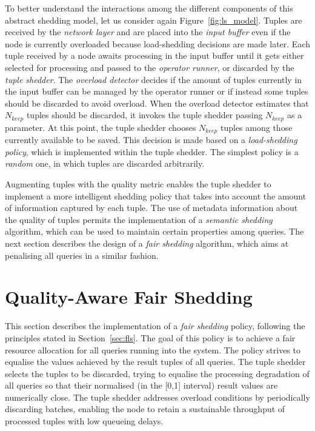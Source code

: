 To better understand the interactions among the different components of this abstract shedding model, let
us consider again Figure~\ref{fig:ls_model}. Tuples are received by the \emph{network layer} and are
placed into the \emph{input buffer} even if the node is currently overloaded because \mbox{load-shedding}
decisions are made later. Each tuple received by a node awaits processing in the input buffer until it
gets either selected for processing and passed to the \emph{operator runner}, or discarded by the
\emph{tuple shedder}. The \emph{overload detector} decides if the amount of tuples
currently in the input buffer can be managed by the operator runner or if instead some tuples should
be discarded to avoid overload. When the overload detector estimates that $N_{keep}$ tuples should be
discarded, it invokes the tuple shedder passing $N_{keep}$ as a parameter. At this point, the tuple
shedder chooses $N_{keep}$ tuples among those currently available to be saved.
This decision is made based on a \emph{\mbox{load-shedding} policy}, which is implemented within the tuple
shedder. The simplest policy is a \emph{random} one, in which tuples are discarded arbitrarily.

Augmenting tuples with the \sic quality metric enables the tuple shedder to
implement a more intelligent shedding policy that takes into account the amount of information captured
by each tuple.
The use of metadata information about the quality of tuples permits the implementation of a
\emph{semantic shedding} algorithm, which can be used to maintain certain properties among queries. The
next section describes the design of a \emph{fair shedding} algorithm, which aims at penalising all
queries in a similar fashion.

\section{Quality-Aware Fair Shedding}
\label{sec:fair-shedding}

This section describes the implementation of a \emph{fair shedding} policy, following the principles
stated in Section~\ref{sec:fls}. The goal of this policy is to achieve a fair resource
allocation for all queries running into the system. The policy strives to equalise the \sic values
achieved by the result tuples of all queries.  
The tuple shedder selects the tuples to be discarded, trying to equalise the processing
degradation of all queries so that their normalised (\ie in the [0,1] interval) result \sic values
are numerically close.
The tuple shedder addresses overload conditions by periodically discarding batches, enabling the node
to retain a sustainable throughput of processed tuples with low queueing delays. 

